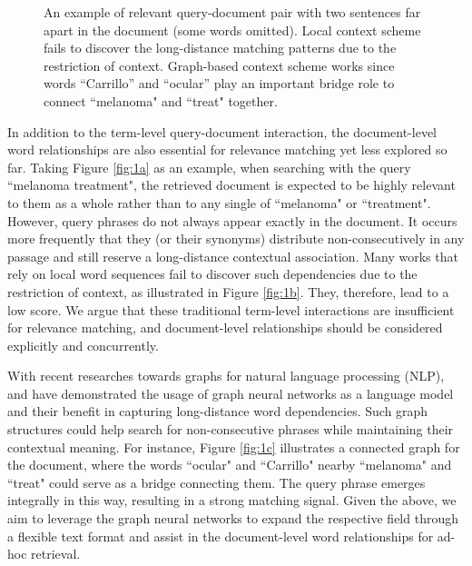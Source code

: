 \begin{figure}[t]
{	\label{fig:1c}}
	\label{fig:1} 
	\caption{An example of relevant query-document pair with two sentences far apart in the document (some words omitted). Local context scheme fails to discover the long-distance matching patterns due to the restriction of context. Graph-based context scheme works since words ``Carrillo'' and ``ocular'' play an important bridge role to connect ``melanoma" and ``treat" together.}
\end{figure}

In addition to the term-level query-document interaction, the document-level word relationships are also essential for relevance matching yet less explored so far. Taking Figure \ref{fig:1a} as an example, when searching with the query ``melanoma treatment", the retrieved document is expected to be highly relevant to them as a whole rather than to any single of ``melanoma" or ``treatment". However, query phrases do not always appear exactly in the document. It occurs more frequently that they (or their synonyms) distribute non-consecutively in any passage and still reserve a long-distance contextual association. Many works that rely on local word sequences \cite{pang2016text,pang2017deeprank,hui2017pacrr} fail to discover such dependencies due to the restriction of context, as illustrated in Figure \ref{fig:1b}. They, therefore, lead to a low score. We argue that these traditional term-level interactions are insufficient for relevance matching, and document-level relationships should be considered 
explicitly and concurrently. 

With recent researches towards graphs for natural language processing (NLP), \citet{yao2019graph} and \citet{zhang2020every} have demonstrated the usage of graph neural networks as a language model and their benefit in capturing long-distance word dependencies. Such graph structures could help search for non-consecutive phrases while maintaining their contextual meaning. For instance, Figure \ref{fig:1c} illustrates a connected graph for the document, where the words ``ocular" and ``Carrillo" nearby ``melanoma" and ``treat" could serve as a bridge connecting them. The query phrase emerges integrally in this way, resulting in a strong matching signal. Given the above, we aim to leverage the graph neural networks to expand the respective field through a flexible text format and assist in the document-level word relationships for ad-hoc retrieval.

